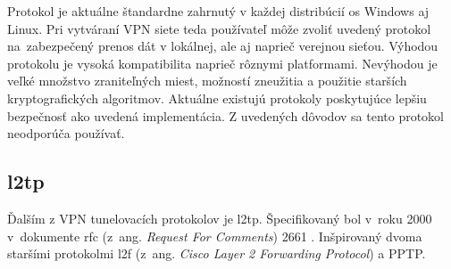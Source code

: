 Protokol je aktuálne štandardne zahrnutý v každej distribúcií \acrshort{os} Windows aj Linux. Pri vytváraní VPN siete teda používateľ môže zvoliť uvedený protokol na~zabezpečený prenos dát v lokálnej, ale aj naprieč verejnou sieťou. Výhodou protokolu je vysoká kompatibilita naprieč rôznymi platformami. Nevýhodou je veľké množstvo zraniteľných miest, možností zneužitia a použitie starších kryptografických algoritmov. Aktuálne existujú protokoly poskytujúce lepšiu bezpečnosť ako uvedená implementácia. Z uvedených dôvodov sa tento protokol neodporúča používať.


\subsection{\acrfull{l2tp}}
Ďalším z VPN tunelovacích protokolov je \acrshort{l2tp}. Špecifikovaný bol v~roku 2000 v~dokumente \acrshort{rfc} (z~ang. \textit{Request For Comments}) 2661 \cite{rfc2661}. Inšpirovaný dvoma staršími protokolmi \acrshort{l2f} (z~ang. \textit{Cisco Layer 2 Forwarding Protocol}) \cite{rfc2341} a PPTP.   

